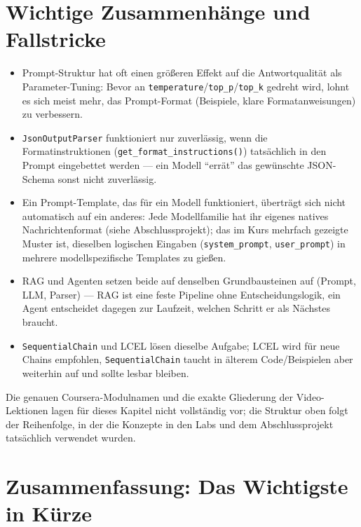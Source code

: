 \section{Wichtige Zusammenhänge und Fallstricke}

\begin{itemize}
    \item Prompt-Struktur hat oft einen größeren Effekt auf die Antwortqualität als
          Parameter-Tuning: Bevor an \texttt{temperature}/\texttt{top\_p}/\texttt{top\_k}
          gedreht wird, lohnt es sich meist mehr, das Prompt-Format (Beispiele, klare
          Formatanweisungen) zu verbessern.
    \item \texttt{JsonOutputParser} funktioniert nur zuverlässig, wenn die
          Formatinstruktionen (\texttt{get\_format\_instructions()}) tatsächlich in den
          Prompt eingebettet werden --- ein Modell \enquote{errät} das gewünschte JSON-Schema
          sonst nicht zuverlässig.
    \item Ein Prompt-Template, das für ein Modell funktioniert, überträgt sich nicht
          automatisch auf ein anderes: Jede Modellfamilie hat ihr eigenes natives
          Nachrichtenformat (siehe Abschlussprojekt); das im Kurs mehrfach gezeigte
          Muster ist, dieselben logischen Eingaben (\texttt{system\_prompt},
          \texttt{user\_prompt}) in mehrere modellspezifische Templates zu gießen.
    \item RAG und Agenten setzen beide auf denselben Grundbausteinen auf (Prompt, LLM,
          Parser) --- RAG ist eine feste Pipeline ohne Entscheidungslogik, ein Agent
          entscheidet dagegen zur Laufzeit, welchen Schritt er als Nächstes braucht.
    \item \texttt{SequentialChain} und LCEL lösen dieselbe Aufgabe; LCEL wird für neue
          Chains empfohlen, \texttt{SequentialChain} taucht in älterem Code/Beispielen
          aber weiterhin auf und sollte lesbar bleiben.
\end{itemize}

\begin{luecke}
Die genauen Coursera-Modulnamen und die exakte Gliederung der Video-Lektionen lagen für
dieses Kapitel nicht vollständig vor; die Struktur oben folgt der Reihenfolge, in der die
Konzepte in den Labs und dem Abschlussprojekt tatsächlich verwendet wurden.
\end{luecke}

\section{Zusammenfassung: Das Wichtigste in Kürze}

